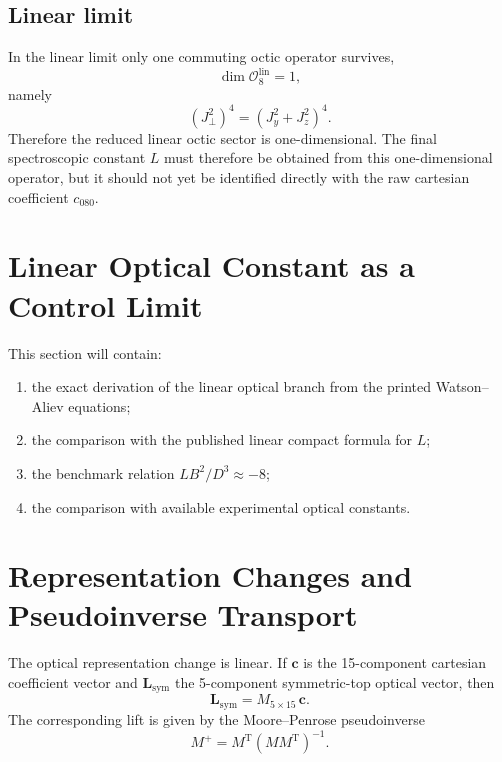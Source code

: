 \documentclass[aip,jcp,reprint,floatfix]{revtex4-2}
\begin{document}
\subsection{Linear limit}

In the linear limit only one commuting octic operator survives,
\begin{equation}
\dim \mathcal O_8^{\mathrm{lin}} = 1,
\end{equation}
namely
\begin{equation}
(J_\perp^2)^4=(J_y^2+J_z^2)^4.
\end{equation}
Therefore
the reduced linear octic sector is one-dimensional. The final spectroscopic
constant \(L\) must therefore be obtained from this one-dimensional operator,
but it should not yet be identified directly with the raw cartesian coefficient
\(c_{080}\).

\section{Linear Optical Constant as a Control Limit}

This section will contain:
\begin{enumerate}
\item the exact derivation of the linear optical branch from the printed
Watson--Aliev equations;
\item the comparison with the published linear compact formula for \(L\);
\item the benchmark relation \(L B^2/D^3 \approx -8\);
\item the comparison with available experimental optical constants.
\end{enumerate}

\section{Representation Changes and Pseudoinverse Transport}

The optical representation change is linear. If \(\mathbf c\) is the
15-component cartesian coefficient vector and \(\mathbf L_{\mathrm{sym}}\) the
5-component symmetric-top optical vector, then
\begin{equation}
\mathbf L_{\mathrm{sym}} = M_{5\times 15}\,\mathbf c.
\end{equation}
The corresponding lift is given by the Moore--Penrose pseudoinverse
\begin{equation}
M^{+} = M^{\mathrm T}(MM^{\mathrm T})^{-1}.
\end{equation}
\end{document}
